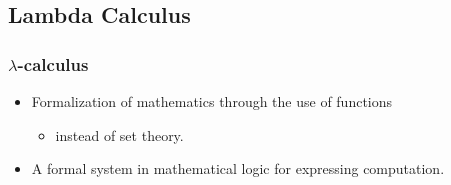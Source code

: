 \subsection{Lambda Calculus}

\begin{frame}
  \frametitle{$\lambda$-calculus}
  \begin{itemize}
    \item Formalization of mathematics through the use of functions
      \begin{itemize}
        \item instead of set theory.
      \end{itemize}
    \item A formal system in mathematical logic for expressing computation.
     
  \end{itemize}
\end{frame}